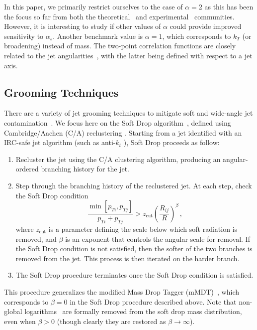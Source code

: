 \documentclass[11pt]{cernrep}
\begin{document}
In this paper, we primarily restrict ourselves to the case of $\alpha=2$ as this has been the focus so far from both the theoretical~\cite{Frye:2016okc,Frye:2016aiz,Marzani:2017kqd,Marzani:2017mva} and experimental~\cite{Aaboud:2017qwh,CMS-PAS-SMP-16-010} communities.
%
However, it is interesting to study if other values of $\alpha$ could provide improved sensitivity to $\alpha_s$.
%
Another benchmark value is $\alpha=1$, which corresponds to $k_T$ (or broadening) instead of mass.
%
The two-point correlation functions are closely related to the jet angularities~\cite{Berger:2003iw,Almeida:2008yp,Ellis:2010rwa,Larkoski:2014pca}, with the latter being defined with respect to a jet axis.

\subsection{Grooming Techniques}\label{jetsub_alphas_sec:groom_tech}

There are a variety of jet grooming techniques to mitigate soft and wide-angle jet contamination~\cite{Butterworth:2008iy,Ellis:2009su,Ellis:2009me,Krohn:2009th,Dasgupta:2013ihk,Larkoski:2014wba}.
%
We focus here on the Soft Drop algorithm~\cite{Larkoski:2014wba}, defined using Cambridge/Aachen (C/A) reclustering \cite{Dokshitzer:1997in,Wobisch:1998wt,Wobisch:2000dk}.
%
Starting from a jet identified with an IRC-safe jet algorithm (such as anti-$k_t$ \cite{Cacciari:2008gp}), Soft Drop proceeds as follow:
%
\begin{enumerate}
%
\item Recluster the jet using the C/A clustering algorithm, producing an angular-ordered branching history for the jet.
%
\item Step through the branching history of the reclustered jet.  At each step, check the Soft Drop condition
%
\begin{equation}\label{jetsub_alphas_eq:sd_cut}
\frac{\min\left[ p_{Ti}, p_{Tj}  \right]}{p_{Ti}+p_{Tj}}> z_{\mathrm{cut}} \left(   \frac{R_{ij}}{R}\right)^\beta \,,
\end{equation}
%
where $z_{\mathrm{cut}} $ is a parameter defining the scale below which soft radiation is removed, and $\beta$ is an exponent that controls the angular scale for removal.
%
If the Soft Drop condition is not satisfied, then the softer of the two branches is removed from the jet.  This process is then iterated on the harder branch.
%
\item The Soft Drop procedure terminates once the Soft Drop condition is satisfied.
%
\end{enumerate}
%
This procedure generalizes the modified Mass Drop Tagger (mMDT)~\cite{Dasgupta:2013ihk}, which corresponds to $\beta=0$ in the Soft Drop procedure described above.
%
Note that non-global logarithms~\cite{Dasgupta:2001sh} are formally removed from the soft drop mass distribution, even when $\beta>0$ (though clearly they are restored as $\beta\rightarrow\infty$).
\end{document}

